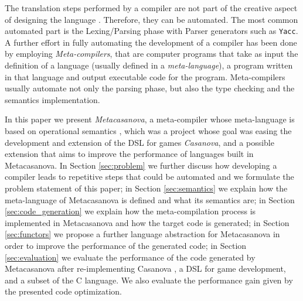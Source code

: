 The translation steps performed by a compiler are not part of the creative aspect of designing the language \cite{book1970cwic, czarnecki2000generative}. Therefore, they can be automated. The most common automated part is the Lexing/Parsing phase with Parser generators such as \texttt{Yacc}. A further effort in fully automating the development of a compiler has been done by employing \textit{Meta-compilers}, that are computer programs that take as input the definition of a language (usually defined in a \textit{meta-language}), a program written in that language and output executable code for the program. Meta-compilers usually automate not only the parsing phase, but also the type checking and the semantics implementation.
 
In this paper we present \textit{Metacasanova}, a meta-compiler whose meta-language is based on operational semantics \cite{plotkin1981, kahn1987natural}, which was a project whose goal was easing the development and extension of the DSL for games \textit{Casanova}, and a possible extension that aims to improve the performance of languages built in Metacasanova. In Section \ref{sec:problem} we further discuss how developing a compiler leads to repetitive steps that could be automated and we formulate the problem statement of this paper; in Section \ref{sec:semantics} we explain how the meta-language of Metacasanova is defined and what its semantics are; in Section \ref{sec:code_generation} we explain how the meta-compilation process is implemented in Metacasanova and how the target code is generated; in Section \ref{sec:functors} we propose a further language abstraction for Metacasanova in order to improve the performance of the generated code; in Section \ref{sec:evaluation} we evaluate the performance of the code generated by Metacasanova after re-implementing Casanova \cite{abbadi2015casanova}, a DSL for game development, and a subset of the C language. We also evaluate the performance gain given by the presented code optimization.

